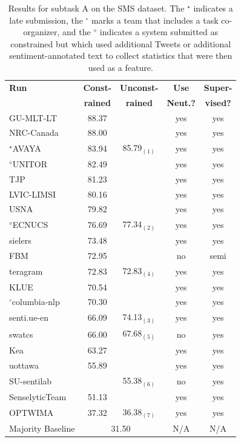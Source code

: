 \begin{table}[hbt]
    \centering
    \begin{small}
    \begin{tabular}{@{ }lc@{ }c@{ }cc@{ }}
    \bf Run & \bf Const- & \bf Unconst- & \bf Use & \bf Super-\\
    & \bf rained & \bf rained & \bf Neut.? & \bf vised?\\
    \hline
    GU-MLT-LT & 88.37 &  & yes & yes\\
    NRC-Canada & 88.00 &  & yes & yes\\
    $^\star$AVAYA & 83.94 & 85.79$_{(1)}$ & yes & yes\\
    $^\diamond$UNITOR & 82.49 &  & yes & yes\\
    TJP & 81.23 &  & yes & yes\\
    LVIC-LIMSI & 80.16 &  & yes & yes\\
    USNA & 79.82 &  & yes & yes\\
    $^\diamond$ECNUCS & 76.69 & 77.34$_{(2)}$ & yes & yes\\
    sielers & 73.48 &  & yes & yes\\
    FBM & 72.95 &  & no & semi\\
    teragram & 72.83 & 72.83$_{(4)}$ & yes & yes\\
    KLUE & 70.54 &  & yes & yes\\
    $^\circ$columbia-nlp & 70.30 &  & yes & yes\\
    senti.ue-en & 66.09 & 74.13$_{(3)}$ & yes & yes\\
    swatcs & 66.00 & 67.68$_{(5)}$ & no & yes\\
    Kea & 63.27 &  & yes & yes\\
    uottawa & 55.89 &  & yes & yes\\
    SU-sentilab &  & 55.38$_{(6)}$ & no & yes\\
    SenselyticTeam & 51.13 &  & yes & yes\\
    OPTWIMA & 37.32 & 36.38$_{(7)}$ & yes & yes\\
   \hline
    Majority Baseline & \multicolumn{2}{c}{31.50}  & N/A & N/A \\
    \hline
        \end{tabular}
    \end{small}
    \caption{\label{tab:TaskASMS}Results for subtask A on the SMS dataset. The $^\star$ indicates a late submission,
                the $^\circ$ marks a team that includes a task co-organizer,
             and the $^\diamond$ indicates a system submitted as constrained but which used additional Tweets or additional sentiment-annotated text
             to collect statistics that were then used as a feature.}
  \end{table}
